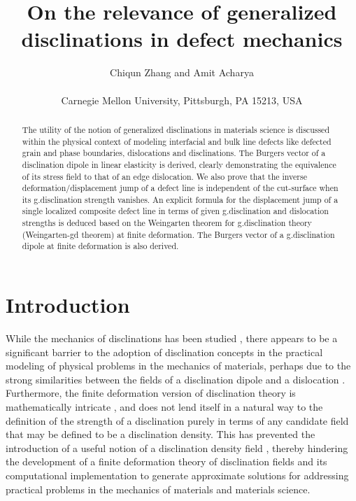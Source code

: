 \documentclass[11pt,letterpaper]{article}
\begin{document}
\title{On the relevance of generalized disclinations in defect mechanics}
\author{Chiqun Zhang and Amit Acharya\\ \\
Carnegie Mellon University, Pittsburgh, PA 15213, USA \\ }
\date{}
\maketitle

\begin{abstract}

\noindent The utility of the notion of generalized disclinations in materials science is discussed within the physical context of modeling interfacial and bulk line defects like defected grain and phase boundaries, dislocations and disclinations. The Burgers vector of a disclination dipole in linear elasticity is derived, clearly demonstrating the equivalence of its stress field to that of an edge dislocation. We also prove that the inverse deformation/displacement jump of a defect line is independent of the cut-surface when its g.disclination strength vanishes. An explicit formula for the displacement jump of a single localized composite defect line in terms of given g.disclination and dislocation strengths is deduced based on the Weingarten theorem for g.disclination theory (Weingarten-gd theorem) at finite deformation. The Burgers vector of a g.disclination dipole at finite deformation is also derived.

\end{abstract}

\section{Introduction}

While the mechanics of disclinations has been studied \cite{wit1970linear, dewit1971relation, dewit1973theory, de1973theory, Nabarro1987, hirth2006disconnections, zubov1997nonlinear, romanov2009application, fressengeas2011elasto}, there appears to be a significant barrier to the adoption of disclination concepts in the practical modeling of physical problems in the mechanics of materials, perhaps due to the strong similarities between the fields of a disclination dipole and a dislocation \cite{romanov2009application}. Furthermore, the finite deformation version of disclination theory is mathematically intricate \cite{zubov1997nonlinear,derezin2011disclinations}, and does not lend itself in a natural way to the definition of the strength of a disclination purely in terms of any candidate field that may be defined to be a disclination density. This has prevented the introduction of a useful notion of a disclination density field \cite{zubov1997nonlinear,derezin2011disclinations}, thereby hindering the development of a finite deformation theory of disclination fields and its computational implementation to generate approximate solutions for addressing practical problems in the mechanics of materials and materials science. 
\end{document}
